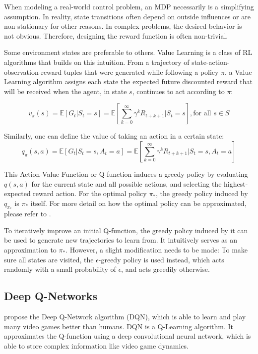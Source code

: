 When modeling a real-world control problem, an MDP necessarily is a simplifying assumption.
In reality, state transitions often depend on outside influences or are non-stationary for other reasons.
In complex problems, the desired behavior is not obvious. Therefore, designing the reward function is often non-trivial.


Some environment states are preferable to others.
Value Learning is a class of RL algorithms that builds on this intuition.
From a trajectory of state-action-observation-reward tuples that were generated while following a policy $\pi$, a Value Learning algorithm assigns each state the expected future discounted reward that will be received when the agent, in state $s$, continues to act according to $\pi$:

$$v_\pi(s) = \mathbb{E}[G_t | S_t=s] = \mathbb{E}[\sum_{k=0}^{\infty}\gamma^kR_{t+k+1} | S_t = s], \text{for all } s \in S$$

Similarly, one can define the value of taking an action in a certain state:
$$ q_\pi(s,a) = \mathbb{E}[G_t | S_t=s, A_t = a] = \mathbb{E}[\sum_{k=0}^{\infty}\gamma^kR_{t+k+1} | S_t = s, A_t = a]$$

This Action-Value Function or Q-function induces a greedy policy by evaluating $q(s,a)$ for the current state and all possible actions, and selecting the highest-expected reward action.
For the optimal policy $\pi_*$, the greedy policy induced by $q_{\pi_*}$ is $\pi_*$ itself.
For more detail on how the optimal policy can be approximated, please refer to \cite{sutton2018ReinforcementLearningIntroduction}.

To iteratively improve an initial Q-function, the greedy policy induced by it can be used to generate new trajectories to learn from.
It intuitively serves as an approximation to $\pi_*$.
However, a slight modification needs to be made: To make sure all states are visited, the $\epsilon$-greedy policy is used instead, which acts randomly with a small probability of $\epsilon$, and acts greedily otherwise.

\subsection{Deep Q-Networks}
\cite{mnih2015HumanlevelControlDeep} propose the Deep Q-Network algorithm (DQN), which is able to learn and play many video games better than humans.
DQN is a Q-Learning algorithm.
It approximates the Q-function using a deep convolutional neural network, which is able to store complex information like video game dynamics.


